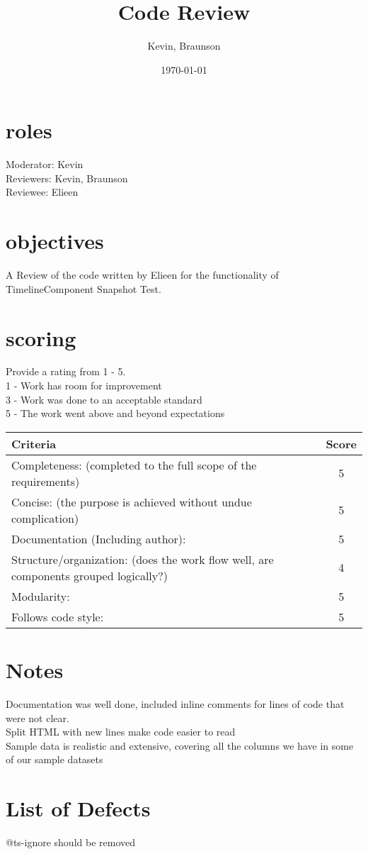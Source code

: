 \documentclass{article}
\title{Code Review}
\author{Kevin, Braunson}
\date{\today}
\begin{document}
\maketitle

\section{roles}
Moderator: Kevin \\
Reviewers: Kevin, Braunson\\
Reviewee: Elieen\\

\section{objectives}
A Review of the code written by Elieen for the functionality of TimelineComponent Snapshot Test. 


\section{scoring}
    Provide a rating from 1 - 5. \\
    1 - Work has room for improvement \\
    3 - Work was done to an acceptable standard \\
    5 - The work went above and beyond expectations\\

\begin{tabular}{|l|c|}
	\hline
	Criteria & Score\\
	\hline
    Completeness:
    (completed to the full scope of the requirements) & 5 \\
	\hline
    Concise:
    (the purpose is achieved without undue complication) & 5 \\
	\hline
    Documentation (Including author): & 5\\
    \hline
    Structure/organization:
    (does the work flow well, are components grouped logically?) & 4\\
    \hline
    Modularity: & 5\\
    \hline
    Follows code style: & 5\\
    \hline
\end{tabular}

\section{Notes}

Documentation was well done, included inline comments for lines of code that were not clear.\\
Split HTML with new lines make code easier to read\\
Sample data is realistic and extensive, covering all the columns we have in some of our sample datasets\\

\pagebreak

\section{List of Defects}
@ts-ignore should be removed\\
\end{document}
